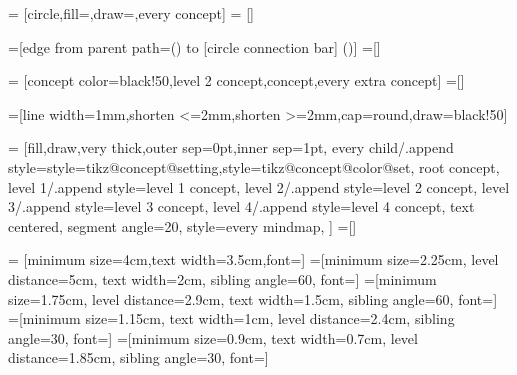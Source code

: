 




=          [circle,fill=\tikz@concept@color,draw=\tikz@concept@color,every concept]
=    []

\def\tikz@concept@color{black}

=[edge from parent path={(\tikzparentnode) to [circle connection bar] (\tikzchildnode)}]
=[]


=     [concept color=black!50,level 2 concept,concept,every extra concept]
=[]

=[line width=1mm,shorten <=2mm,shorten >=2mm,cap=round,draw=black!50]



=
  [fill,draw,very thick,outer sep=0pt,inner sep=1pt,%
   every child/.append style={style=tikz@concept@setting,style=tikz@concept@color@set},%
   root concept,
   level 1/.append style={level 1 concept},
   level 2/.append style={level 2 concept},
   level 3/.append style={level 3 concept},
   level 4/.append style={level 4 concept},
   text centered,%
   segment angle=20,
   style=every mindmap,
  ]
=[]


=   [minimum size=4cm,text width=3.5cm,font=\pgfutil@font@large]
=[minimum size=2.25cm,
                             level distance=5cm,
                             text width=2cm,
                             sibling angle=60,
                             font=\pgfutil@font@small]
=[minimum size=1.75cm,%
                             level distance=2.9cm,%
                             text width=1.5cm,%
                             sibling angle=60,%
                             font=\pgfutil@font@footnotesize]
=[minimum size=1.15cm,%
                             text width=1cm,%
                             level distance=2.4cm,%
                             sibling angle=30,%
                             font=\pgfutil@font@tiny]
=[minimum size=0.9cm,%
                             text width=0.7cm,
                             level distance=1.85cm,%
                             sibling angle=30,%
                             font=\pgfutil@font@tiny]
  
